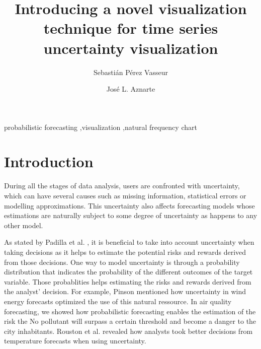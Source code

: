 \documentclass[a4paper,3p,sort&compress]{elsarticle}
\begin{document}
\linenumbers

\newcommand{\no}{NO\textsubscript{2}\xspace}

\begin{frontmatter}

  \title{Introducing a novel visualization technique for time series uncertainty visualization}


  \author{Sebasti\'an P\'erez Vasseur}
  \author{Jos\'e L. Aznarte}
  \address{Artificial Intelligence Department\\Universidad Nacional de
    Educaci\'on a Distancia --- UNED\\c/ Juan del Rosal, 16, Madrid, Spain}
  

\begin{abstract}
  
\end{abstract}

\begin{keyword}
probabilistic forecasting \sep visualization \sep natural frequency chart
\end{keyword}

\end{frontmatter}


\section{Introduction}
\label{sec:intro}

During all the stages of data analysis, users are confronted with uncertainty, which can have 
several causes such as missing information, statistical errors or modelling approximations.
This uncertainty also affects forecasting models whose estimations are naturally 
subject to some degree of uncertainty as happens to any other model. 

As stated by Padilla et al. \cite{padilla_uncertainty_2021}, it is beneficial to take into account uncertainty 
when taking decisions as it
helps to estimate the potential risks and rewards derived from those decisions. One way to model uncertainty is through a 
probability distribution that indicates the probability of the different outcomes of the target variable. 
Those probablities helps estimating the risks and rewards derived from the analyst'
decision. For example, Pinson mentioned how uncertainty 
in wind energy forecasts optimized the use of this natural ressource. In air quality forecasting, we showed 
how probabilistic forecasting enables the estimation of the risk the No pollutant will surpass a certain threshold 
and become a danger to the city inhabitants. Rouston et al. \cite{roulston_laboratory_2006} revealed how analysts 
took better decisions from temperature forecasts when using uncertainty.
\end{document}
